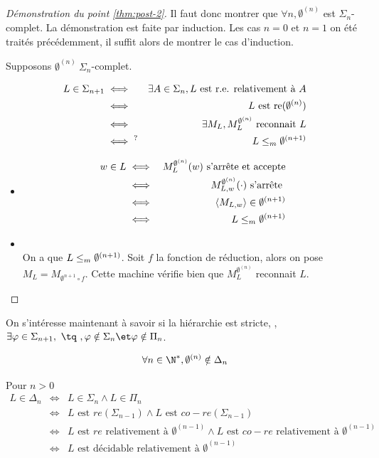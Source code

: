 \begin{proof}[Démonstration du point \ref{thm:post-2}]
	Il faut donc montrer que $\forall n, \emptyset^{(n)}$ est $\Sigma_n$-complet.
	La démonstration est faite par induction. Les cas $n=0$ et $n=1$ on été traités précédemment, il suffit alors de montrer le cas d'induction.

	Supposons $\emptyset^{(n)} \ \Sigma_n$-complet.

	\begin{eqnarray*}
		L \in \Sigma_{n+1} &\iff& \exists A \in \Sigma_n, L \text { est r.e. relativement à } A \\
		&\iff& L \text{ est re}(\emptyset^{(n)})\\
		&\iff& \exists M_L, M_L^{\emptyset^{(n)}} \text { reconnait } L \\
		&\iff^? & L \leq_m \emptyset^{(n + 1)}
	\end{eqnarray*}

	\begin{itemize}
		\item \bimpLR
		      \begin{eqnarray*}
			      w \in  L  &\iff&  M_L^{\emptyset^{(n)}}(w) \text{ s'arrête et accepte} \\
			      &\iff&  M_{L,w}^{\emptyset^{(n)}}(\cdot) \text{ s'arrête } \\
			      &\iff&  \left\langle M_{L,w}\right\rangle \in \emptyset^{(n+1)} \\
			      &\iff&  L \leq_m  \emptyset^{(n+1)}
		      \end{eqnarray*}
		\item \bimpRL \\
		      On a que $L \leq_m \emptyset^{(n+1)}$. Soit $f$ la fonction de réduction, alors on pose
		      $M_L = M_{\emptyset^{n+1} \circ f}$. Cette machine vérifie bien que $M_L^{\emptyset^{(n)}}$ reconnait  $L$.
	\end{itemize}
\end{proof}



On s'intéresse maintenant à savoir si la hiérarchie est stricte, \ie, $\exists \phi \in \Sigma_{n+1}, \text{ \tq }, \phi \notin \Sigma_n \et \phi \notin \Pi_n$.


\begin{prop}
	$$\forall n \in \N^*, \emptyset^{(n)} \notin \Delta_n$$
\end{prop}


\begin{remarque}
	Pour $n > 0$
	\begin{eqnarray*}
		L \in \Delta_n &\iff& L \in \Sigma_n \land L \in \Pi_n \\
		&\iff& L \text{ est } re(\Sigma_{n-1}) \land L \text{ est } co-re(\Sigma_{n-1})\\
		&\iff& L \text{ est } re \text{ relativement à } \emptyset^{(n-1)} \land  L \text{ est } co-re \text{ relativement à } \emptyset^{(n-1)} \\
		&\iff& L \text{ est décidable relativement à } \emptyset^{(n-1)}
	\end{eqnarray*}
\end{remarque}

